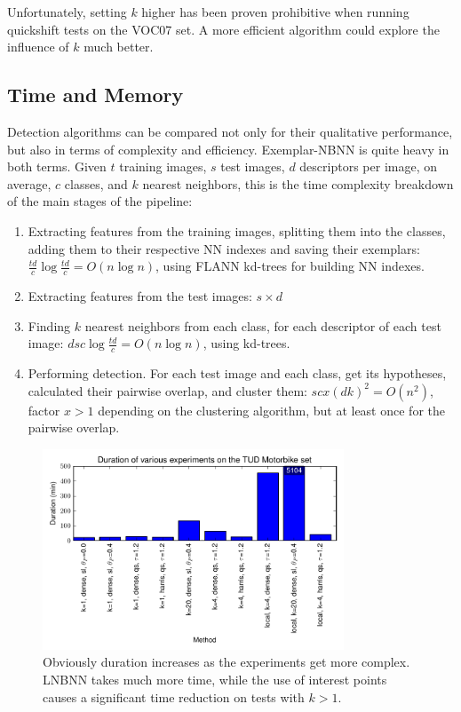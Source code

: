 Unfortunately, setting $k$ higher has been proven prohibitive when running quickshift tests on the VOC07 set. A more efficient algorithm could explore the influence of $k$ much better.


\subsection{Time and Memory} %
\label{sub:time_and_memory_constraints}

Detection algorithms can be compared not only for their qualitative performance, but also in terms of complexity and efficiency. Exemplar-NBNN is quite heavy in both terms. Given $t$ training images, $s$ test images, $d$ descriptors per image, on average, $c$ classes, and $k$ nearest neighbors, this is the time complexity breakdown of the main stages of the pipeline:
\begin{enumerate}
    \item Extracting features from the training images, splitting them into the classes, adding them to their respective NN indexes and saving their exemplars: $\frac{td}{c} \log \frac{td}{c} = O(n\log n)$, using FLANN kd-trees for building NN indexes.
    \item Extracting features from the test images: $s\times d$
    \item Finding $k$ nearest neighbors from each class, for each descriptor of each test image: $d s c \log \frac{td}{c} = O(n \log n)$, using kd-trees.
    \item Performing detection. For each test image and each class, get its hypotheses, calculated their pairwise overlap, and cluster them: $s c x (d k)^2 = O(n^2)$, factor $x>1$ depending on the clustering algorithm, but at least once for the pairwise overlap.
\end{enumerate}

\begin{figure}[hbt]
    \centering
    \includegraphics[width=0.8\textwidth]{DurTUD}
    \caption{Obviously duration increases as the experiments get more complex. LNBNN takes much more time, while the use of interest points causes a significant time reduction on tests with $k>1$.}
    \label{fig:durationTUD}
\end{figure}

